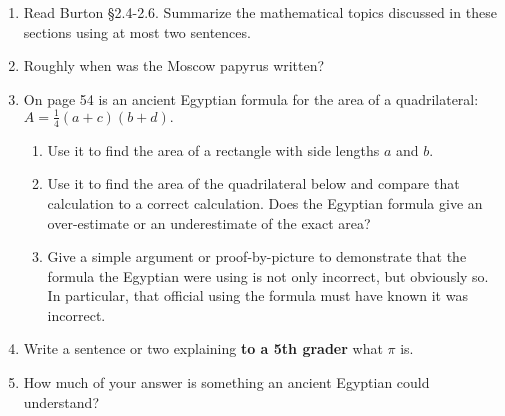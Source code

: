 \documentclass[12pt]{article}
\begin{document}
\begin{enumerate}
\item Read Burton \S 2.4-2.6. Summarize the mathematical topics discussed in these sections using at most two sentences.
\vspace{1in}
\item Roughly when was the Moscow papyrus written?\\

\item On page 54 is an ancient Egyptian formula for the area of a quadrilateral: $A=\frac{1}{4}(a+c)(b+d).$
	\begin{enumerate}
	\item Use it to find the area of a rectangle with side lengths $a$ and $b$.
	\vfill
	\item Use it to find the area of the quadrilateral below and compare that calculation to a correct calculation. Does the Egyptian formula give an over-estimate or an underestimate of the exact area?\\
	\vspace{1.5in}
	\item Give a simple argument or proof-by-picture to demonstrate that the formula the Egyptian were using is not only incorrect, but obviously so. In particular, that official using the formula must have known it was incorrect. 
	\vfill
	\end{enumerate}
\item Write a sentence or two explaining \textbf{to a 5th grader} what $\pi$ is.
\vfill
\item How much of your answer is something an ancient Egyptian could understand?
\vfill
\end{enumerate}
\end{document}
